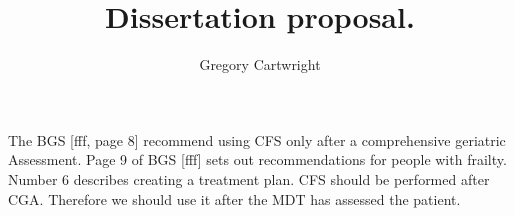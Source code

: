 \documentclass[12pt]{article}
\begin{document}
\author{Gregory Cartwright}
\title{Dissertation proposal.}
\maketitle
The BGS [fff, page 8] recommend using CFS only after a comprehensive geriatric Assessment.
Page 9 of BGS [fff] sets out recommendations for people with frailty.
Number 6 describes creating a treatment plan.
CFS should be performed after CGA. Therefore we should use it after the MDT has assessed the patient.
\end{document}
